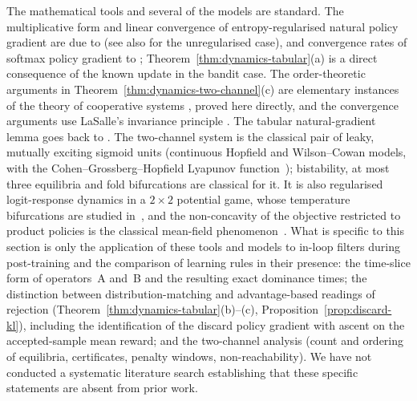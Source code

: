 \begin{remark}
\label{rem:known-vs-new}
The mathematical tools and several of the models are standard. The multiplicative form and linear
convergence of entropy-regularised natural policy gradient are due to
\cite{cen2022fast} (see also \cite{agarwal2021theory} for the
unregularised case), and convergence rates of softmax policy gradient to
\cite{mei2020global}; Theorem~\ref{thm:dynamics-tabular}(a) is a direct
consequence of the known update in the bandit case. The order-theoretic
arguments in Theorem~\ref{thm:dynamics-two-channel}(c) are elementary
instances of the theory of cooperative systems
\cite{smith1995monotone,hirsch2006monotone}, proved here directly, and the
convergence arguments use LaSalle's invariance principle
\cite{lasalle1976stability}. The tabular natural-gradient lemma goes back to \cite{kakade2001natural}. The two-channel system is the classical pair of leaky, mutually exciting sigmoid units (continuous Hopfield and Wilson--Cowan models, with the Cohen--Grossberg--Hopfield Lyapunov function~\cite{hopfield1984,wilson1972,cohen1983}); bistability, at most three equilibria and fold bifurcations are classical for it. It is also regularised logit-response dynamics in a $2\times2$ potential game, whose temperature bifurcations are studied in~\cite{hofbauer2002,leonardos2022}, and the non-concavity of the objective restricted to product policies is the classical mean-field phenomenon~\cite{wainwright2008}. What is specific to this section is only the
application of these tools and models to in-loop filters during post-training and the comparison of learning rules in their presence: the time-slice form of operators~A and~B and the resulting
exact dominance times; the distinction between distribution-matching and
advantage-based readings of rejection
(Theorem~\ref{thm:dynamics-tabular}(b)--(c),
Proposition~\ref{prop:discard-kl}), including the identification of the
discard policy gradient with ascent on the accepted-sample mean reward;
and the two-channel analysis (count and ordering of equilibria,
certificates, penalty windows, non-reachability). We have not conducted a
systematic literature search establishing that these specific statements
are absent from prior work.
\end{remark}
